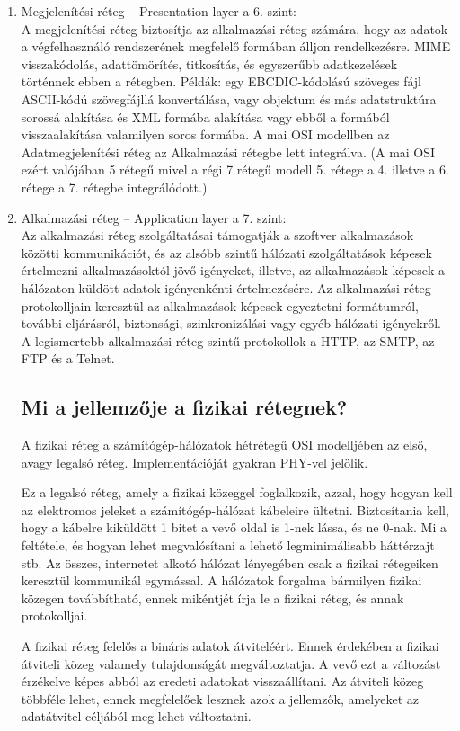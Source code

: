 \documentclass[12pt, a4paper]{article}
\begin{document}
\begin{enumerate}
 \item
 Megjelenítési réteg – Presentation layer a 6. szint:\\
 A megjelenítési réteg biztosítja az alkalmazási réteg számára, hogy az adatok a végfelhasználó rendszerének megfelelő formában álljon rendelkezésre. MIME visszakódolás, adattömörítés, titkosítás, és egyszerűbb adatkezelések történnek ebben a rétegben. Példák: egy EBCDIC-kódolású szöveges fájl ASCII-kódú szövegfájllá konvertálása, vagy objektum és más adatstruktúra sorossá alakítása és XML formába alakítása vagy ebből a formából visszaalakítása valamilyen soros formába.
 A mai OSI modellben az Adatmegjelenítési réteg az Alkalmazási rétegbe lett integrálva. (A mai OSI ezért valójában 5 rétegű mivel a régi 7 rétegű modell 5. rétege a 4. illetve a 6. rétege a 7. rétegbe integrálódott.)
 \item
 Alkalmazási réteg – Application layer a 7. szint:\\
 Az alkalmazási réteg szolgáltatásai támogatják a szoftver alkalmazások közötti kommunikációt, és az alsóbb szintű hálózati szolgáltatások képesek értelmezni alkalmazásoktól jövő igényeket, illetve, az alkalmazások képesek a hálózaton küldött adatok igényenkénti értelmezésére. Az alkalmazási réteg protokolljain keresztül az alkalmazások képesek egyeztetni formátumról, további eljárásról, biztonsági, szinkronizálási vagy egyéb hálózati igényekről. A legismertebb alkalmazási réteg szintű protokollok a HTTP, az SMTP, az FTP és a Telnet.
 \subsection{Mi a jellemzője a fizikai rétegnek?}
 A fizikai réteg a számítógép-hálózatok hétrétegű OSI modelljében az első, avagy legalsó réteg. Implementációját gyakran PHY-vel jelölik.

Ez a legalsó réteg, amely a fizikai közeggel foglalkozik, azzal, hogy hogyan kell az elektromos jeleket a számítógép-hálózat kábeleire ültetni. Biztosítania kell, hogy a kábelre kiküldött 1 bitet a vevő oldal is 1-nek lássa, és ne 0-nak. Mi a feltétele, és hogyan lehet megvalósítani a lehető legminimálisabb háttérzajt stb. Az összes, internetet alkotó hálózat lényegében csak a fizikai rétegeiken keresztül kommunikál egymással. A hálózatok forgalma bármilyen fizikai közegen továbbítható, ennek mikéntjét írja le a fizikai réteg, és annak protokolljai.

A fizikai réteg felelős a bináris adatok átviteléért. Ennek érdekében a fizikai átviteli közeg valamely tulajdonságát megváltoztatja. A vevő ezt a változást érzékelve képes abból az eredeti adatokat visszaállítani. Az átviteli közeg többféle lehet, ennek megfelelőek lesznek azok a jellemzők, amelyeket az adatátvitel céljából meg lehet változtatni.


\end{enumerate}
\end{document}
